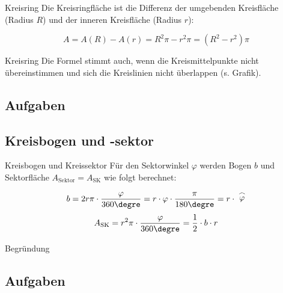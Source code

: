 
\begin{gesetz}{Kreisring}{}
  Die Kreisringfläche ist die Differenz der umgebenden Kreisfläche
  (Radius $R$) und
  der inneren Kreisfläche (Radius $r$):

  $$A = A(R) - A(r) = R^2\pi - r^2\pi = (R^2-r^2)\pi$$
\end{gesetz}

\begin{bemerkung}{Kreisring}{}
  Die Formel stimmt auch, wenn die Kreismittelpunkte nicht
  übereinstimmen und sich die Kreislinien nicht überlappen (s. Grafik).
  \end{bemerkung}

\subsection*{Aufgaben}


\newpage


\subsection{Kreisbogen und -sektor}
\begin{gesetz}{Kreisbogen und
    Kreissektor}{}
  Für den Sektorwinkel $\varphi$ werden Bogen $b$ und Sektorfläche
  $A_{\text{Sektor}}=A_{\text{SK}}$ wie folgt berechnet:
  
  $$b = 2r\pi \cdot{}\frac{\varphi}{360\degre} = r\cdot{} \varphi
  \cdot{} \frac{\pi}{180\degre}= r\cdot{} \stackrel{\frown}{\varphi}$$
  $$A_{\text{SK}} = r^2\pi\cdot{}\frac{\varphi}{360\degre} = \frac12\cdot{}b\cdot{}r$$
\end{gesetz}


Begründung 

\subsection*{Aufgaben}

